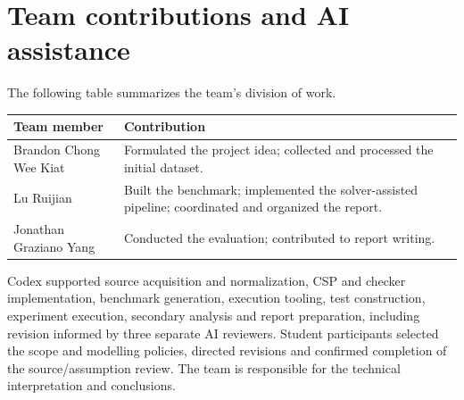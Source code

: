 \documentclass[11pt,a4paper]{article}
\begin{document}
\section{Team contributions and AI assistance}
The following table summarizes the team's division of work.
\begin{center}
\begin{minipage}{\linewidth}
\centering
\begin{tabularx}{\linewidth}{@{}lY@{}}
\toprule
Team member & Contribution\\
\midrule
Brandon Chong Wee Kiat & Formulated the project idea; collected and processed the initial dataset.\\
Lu Ruijian & Built the benchmark; implemented the solver-assisted pipeline; coordinated and organized the report.\\
Jonathan Graziano Yang & Conducted the evaluation; contributed to report writing.\\
\bottomrule
\end{tabularx}
\end{minipage}
\end{center}
Codex supported source acquisition and normalization, CSP and checker
implementation, benchmark generation, execution tooling, test construction,
experiment execution, secondary analysis and report preparation, including
revision informed by three separate AI reviewers. Student participants
selected the scope and modelling policies, directed revisions and confirmed
completion of the source/assumption review. The team is responsible for
the technical interpretation and conclusions.
\end{document}
